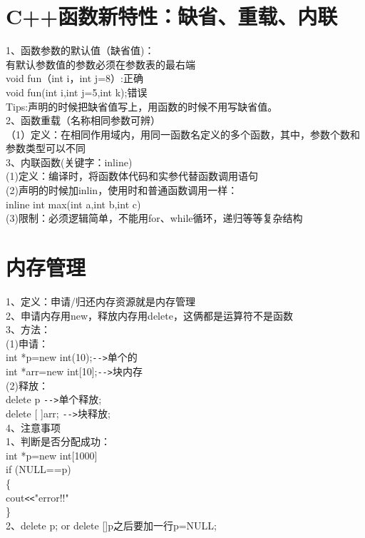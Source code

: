 \documentclass[a4paper,12pt]{article}
\begin{document}
\begin{CJK*}{UTF8}{gbsn}
\section{C++函数新特性：缺省、重载、内联}
\begin{flushleft}
1、函数参数的默认值（缺省值)：\\
有默认参数值的参数必须在参数表的最右端\\
\quad void fun（int i，int j=8）:正确\\
\quad void fun(int i,int j=5,int k);错误\\
Tips:声明的时候把缺省值写上，用函数的时候不用写缺省值。\\
2、函数重载（名称相同参数可辨）\\
（1）定义：在相同作用域内，用同一函数名定义的多个函数，其中，参数个数和参数类型可以不同\\
3、内联函数(关键字：inline)\\
(1)定义：编译时，将函数体代码和实参代替函数调用语句\\
(2)声明的时候加inlin，使用时和普通函数调用一样：\\
inline int max(int a,int b,int c)\\
(3)限制：必须逻辑简单，不能用for、while循环，递归等等复杂结构
\end{flushleft} 

\section{内存管理}
\begin{flushleft}
1、定义：申请/归还内存资源就是内存管理\\
2、申请内存用new，释放内存用delete，这俩都是运算符不是函数\\
3、方法：\\
\quad (1)申请：\\
\qquad int *p=new int(10);\verb|-->|单个的 \\
\qquad int *arr=new int[10];\verb|-->|块内存\\
\quad (2)释放：\\
\qquad delete p \verb|-->|单个释放;\\
\qquad delete [ ]arr; \verb|-->|块释放;\\
4、注意事项\\
1、判断是否分配成功：\\
\qquad int *p=new int[1000]\\
\qquad if (NULL==p)\\
\qquad \{\\
\qquad    cout\verb|<<|"error!!"\\
\qquad \}\\
2、delete p; or delete []p之后要加一行p=NULL;



\end{flushleft}
\end{CJK*}
\end{document}
